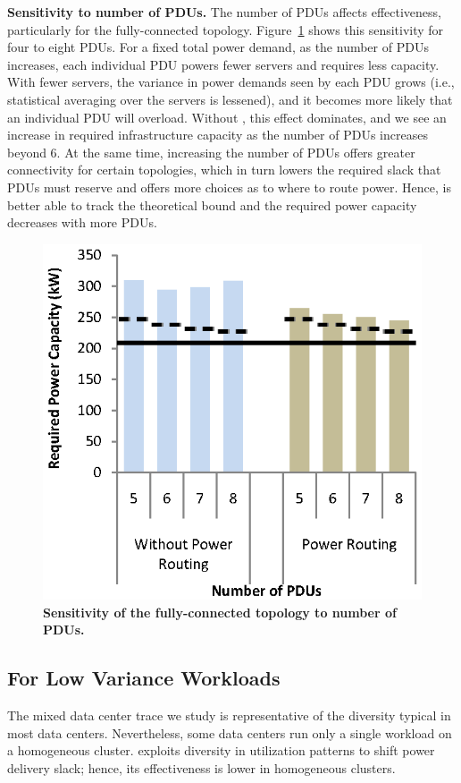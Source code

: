 {\bf Sensitivity to number of PDUs.}
The number of PDUs affects \PowerRouting effectiveness, particularly for the fully-connected topology. Figure~\ref{figure::pdus} shows this sensitivity for four to eight PDUs. For a fixed total power demand, as the number of PDUs increases, each individual PDU powers fewer servers and requires less capacity.  With fewer servers, the variance in power demands seen by each PDU grows (i.e., statistical averaging over the servers is lessened), and it becomes more likely that an individual PDU will overload. Without \PowerRouting, this effect dominates, and we see an increase in required infrastructure capacity as the number of PDUs increases beyond 6.  At the same time, increasing the number of PDUs offers greater connectivity for certain topologies, which in turn lowers the required slack that PDUs must reserve and offers \PowerRouting more choices as to where to route power.  Hence, \PowerRouting is better able to track the theoretical bound and the required power capacity decreases with more PDUs.


\begin{figure}[t!]
\centering
\includegraphics[width = 3.0 in]{Appendices/PowerRouting/figure/result_numPDUs.eps}
\caption{ \textbf{Sensitivity of the fully-connected topology to number of PDUs.} }
\label{figure::pdus}
\vspace{-.1 in}
\end{figure}

\subsection{\PowerRouting For Low Variance Workloads}
The mixed data center trace we study is representative of the diversity typical in most data centers.  Nevertheless, some data centers run only a single workload on a homogeneous cluster.  \PowerRouting exploits diversity in utilization patterns to shift power delivery slack; hence, its effectiveness is lower in homogeneous clusters.  

